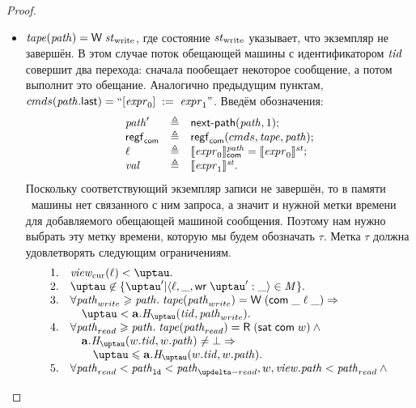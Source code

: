 \begin{proof}
\begin{itemize}
    \item $\tape(\cpath) = \tapeWrite{\Wstate}$, где состояние $\mathit{st}_{\textup{\rm write}}$ указывает, что экземпляр не завершён.
      В этом случае поток обещающей машины с идентификатором $\mathit{tid}$ совершит два перехода:
      сначала пообещает некоторое сообщение, а потом выполнит это обещание.
      Аналогично предыдущим пунктам,
      ${cmds}(\mathit{path}.\textup{\sf last}) = ``[\mathit{expr}_0]\;:=\;\mathit{expr}_1"$.
      Введём обозначения:
      \[\begin{array}{l l l}
        \mathit{path}'    & \triangleq & \mathsf{next}\textsf{-}\mathsf{path}(\mathit{path}, 1); \\
        \mathsf{regf}_\mathsf{com}  & \triangleq & \mathsf{regf}_\mathsf{com}({cmds}, \mathit{tape}, \mathit{path}); \\
        \ell       & \triangleq & \llbracket\mathit{expr}_0\rrbracket ^{\mathit{path}}_\mathsf{com} = \llbracket\mathit{expr}_0\rrbracket ^{\mathit{st}}; \\
        \mathit{val}       & \triangleq & \llbracket\mathit{expr}_1\rrbracket ^{\mathit{st}}. \\
      \end{array}\]
      Поскольку соответствующий экземпляр записи не завершён, то в памяти \ARMt~машины
      нет связанного с ним запроса, а значит и нужной метки времени для добавляемого обещающей машиной сообщения.
      Поэтому нам нужно выбрать эту метку времени, которую мы будем обозначать $\tau$.
      Метка $\tau$ должна удовлетворять следующим ограничениям.
      \[\begin{array}{l l}
        1. & \Rcur(\loc) < \tau. \\
        2. & \tau \not \in \{\tau' | \stRequestWrite{\loc}{\_}{\tau'}{\_} \in \Mprom \}. \\
        3. & \forall \cpath_{write} \ge \cpath. \; \tape(\cpath_{write}) = \tapeWrite{(\tapeWriteCommitted{\_}{\loc}{\_})} \Rightarrow \\
           &  \quad \tau < \aT.\tmap(\tId, \cpath_{write}). \\
        4. & \forall \cpath_{read} \ge \cpath. \; \tape(\cpath_{read}) = \tapeRead{(\tapeSatisfied{\Committed}{\w})} \land {} \\
           & \quad \aT.\tmap(\w.\tId, \w.\cpath) \not = \bot \Rightarrow \\
           & \qquad \tau \le \aT.\tmap(\w.\tId, \w.\cpath). \\
        5. & \forall \cpath_{read} < \cpath_{\LD} < \cpath_{\delta-read}, \w, \R. \cpath < \cpath_{read} \land {} \\

\end{array}\]
\end{itemize}
\end{proof}
